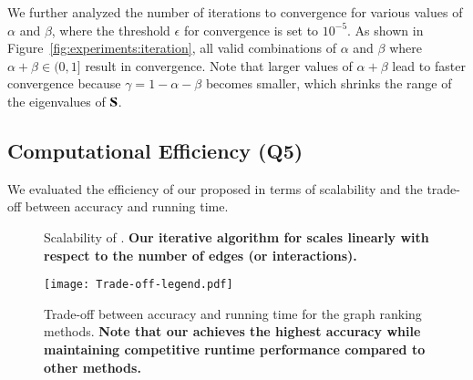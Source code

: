 We further analyzed the number of iterations to convergence for various values of $\alpha$ and $\beta$, where the threshold $\epsilon$ for convergence is set to $10^{-5}$.
As shown in Figure~\ref{fig:experiments:iteration}, all valid combinations of $\alpha$ and $\beta$ where $\alpha + \beta \in (0, 1]$ result in convergence. 
Note that larger values of $\alpha + \beta$ lead to faster convergence because $\gamma = 1 - \alpha - \beta$ becomes smaller, which shrinks the range of the eigenvalues of $\mathbf{S}$.

\subsection{Computational Efficiency (Q5)}
\label{sec:exp:efficiency}
We evaluated the efficiency of our proposed \method in terms of scalability and the trade-off between  accuracy and running time. 

\begin{figure}[t]
    \centering  
    \vspace{3mm}
    \caption{
        \label{fig:scalability}
        Scalability of \method.
        \textbf{Our iterative algorithm for \method scales linearly with respect to the number of edges (or interactions).}
    }
\end{figure}

\begin{figure}[t!]
    \centering
    \hspace{5mm}\texttt{[image: Trade-off-legend.pdf]}\vspace{-2mm}\\
    
    \caption{
        \label{fig:experiments:trade_off}
        Trade-off between accuracy and running time for the graph ranking methods.
        \textbf{Note that our \method achieves the highest accuracy while maintaining competitive runtime performance compared to other methods.}
    }
\end{figure}

